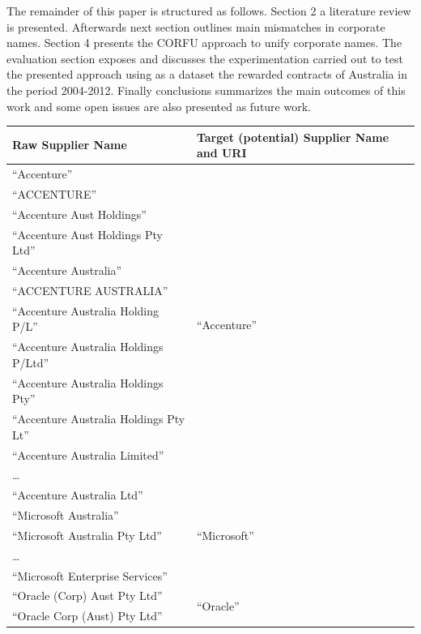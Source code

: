 \documentclass{llncs}
\begin{document}
The remainder of this paper is structured as follows. Section 2 a literature review is presented. Afterwards next section outlines main mismatches in corporate names. Section 4 presents 
the CORFU approach to unify corporate names. The evaluation section exposes and discusses the experimentation carried out to test the presented approach using as a dataset the rewarded 
contracts of Australia in the period 2004-2012. Finally conclusions summarizes the main outcomes of this work 
and some open issues are also presented as future work.


\begin{table}[!htb]
\renewcommand{\arraystretch}{1.3}
\begin{center}
\begin{tabular}{|p{7cm}|p{7cm}|}
\hline
  \textbf{Raw Supplier Name} & \textbf{Target (potential) Supplier Name and URI}  \\  \hline
  ``Accenture'' & \multirow{12}{*}{``Accenture''} \\
  ``ACCENTURE'' & \multirow{12}{*}{\scriptsize\url{http://live.dbpedia.org/resource/Accenture}} \\ 
  ``Accenture Aust Holdings'' & \\  
  ``Accenture Aust Holdings Pty Ltd'' & \\
  ``Accenture Australia'' & \\
  ``ACCENTURE AUSTRALIA'' & \\
  ``Accenture  Australia Holding P/L'' & \\
  ``Accenture Australia Holdings P/Ltd'' & \\
  ``Accenture Australia Holdings Pty'' & \\
  ``Accenture Australia Holdings Pty Lt''  & \\  
  ``Accenture Australia Limited'' & \\
  \ldots  & \\
  ``Accenture Australia Ltd'' & \\ \hline
  ``Microsoft Australia'' & \multirow{3}{*}{``Microsoft''} \\
  ``Microsoft Australia Pty Ltd'' & \multirow{3}{*}{\scriptsize\url{http://live.dbpedia.org/resource/Microsoft}} \\
  \ldots  & \\
  ``Microsoft Enterprise Services'' & \\ \hline
  ``Oracle (Corp) Aust Pty Ltd''  & \multirow{14}{*}{``Oracle''} \\
  ``Oracle Corp (Aust) Pty Ltd''  & \multirow{14}{*}{\scriptsize\url{http://live.dbpedia.org/resource/Oracle_Corporation}} \\

\end{tabular}
\end{center}
\end{table}
\end{document}
